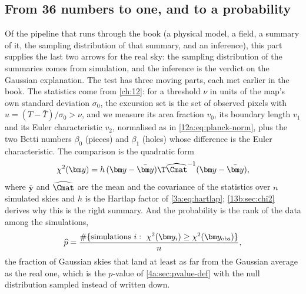\subsection{From 36 numbers to one, and to a probability}
\label{13b:sec:plan}

Of the pipeline that runs through the book (a physical model, a field, a summary of it, the sampling distribution of
that summary, and an inference), this part supplies the last two arrows for the real sky: the sampling distribution of
the summaries comes from simulation, and the inference is the verdict on the Gaussian explanation.
The test has three moving parts, each met earlier in the book. The statistics come from \cref{ch:12}: for a
threshold $\nu$ in units of the map's own standard deviation $\sigma_0$, the excursion set is the set of observed
pixels with $u=(T-\bar T)/\sigma_0>\nu$, and we measure its area fraction $v_0$, its boundary length $v_1$ and its
Euler characteristic $v_2$, normalised as in \eqref{12a:eq:planck-norm}, plus the two Betti numbers $\beta_0$
(pieces) and $\beta_1$ (holes) whose difference is the Euler characteristic. The comparison is the quadratic form
\begin{equation}
  \chi^2(\bm y)=h\,(\bm y-\bar{\bm y})\T\widehat{\Cmat}^{-1}(\bm y-\bar{\bm y}),
  \label{13b:eq:chi2}
\end{equation}
where $\bar{\bm y}$ and $\widehat{\Cmat}$ are the mean and the covariance of the statistics over $n$ simulated
skies and $h$ is the Hartlap factor of \eqref{3a:eq:hartlap}; \cref{13b:sec:chi2} derives why this is the right
summary. And the probability is the rank of the data among the simulations,
\begin{equation}
  \widehat p=\frac{\#\{\text{simulations } i:\ \chi^2(\bm y_i)\ge\chi^2(\bm y_{\rm obs})\}}{n},
  \label{13b:eq:rank-p}
\end{equation}
the fraction of Gaussian skies that land at least as far from the Gaussian average as the real one, which is the
$p$-value of \cref{4a:sec:pvalue-def} with the null distribution sampled instead of written down.

